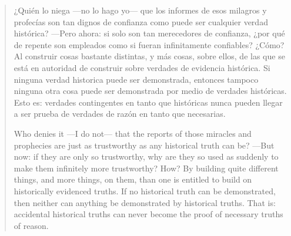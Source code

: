 \begin{enumerate}
  \blockquote[Who denies it ---I do not--- that the reports of those miracles
  and prophecies are just as trustworthy as any historical truth can be? ---But
  now: if they are only so trustworthy, why are they so used as suddenly to make
  them infinitely more trustworthy? How? By building quite different things, and
  more things, on them, than one is entitled to build on historically evidenced
  truths. If no historical truth can be demonstrated, then neither can anything
  be demonstrated by historical truths. That is: accidental historical truths
  can never become the proof of necessary truths of reason.]{¿Quién lo niega
    ---no lo hago yo--- que los informes de esos milagros y profecías son tan
    dignos de confianza como puede ser cualquier verdad histórica? ---Pero
    ahora: si solo son tan merecedores de confianza, ¿por qué de repente son
    empleados como si fueran infinitamente confiables? ¿Cómo? Al construir cosas
    bastante distintas, y más cosas, sobre ellos, de las que se está en
    autoridad de construir sobre verdades de evidencia histórica. Si ninguna
    verdad historica puede ser demonstrada, entonces tampoco ninguna otra cosa
    puede ser demonstrada por medio de verdades históricas. Esto es: verdades
    contingentes en tanto que históricas nunca pueden llegar a ser prueba de
    verdades de razón en tanto que necesarias.}
\end{enumerate}

